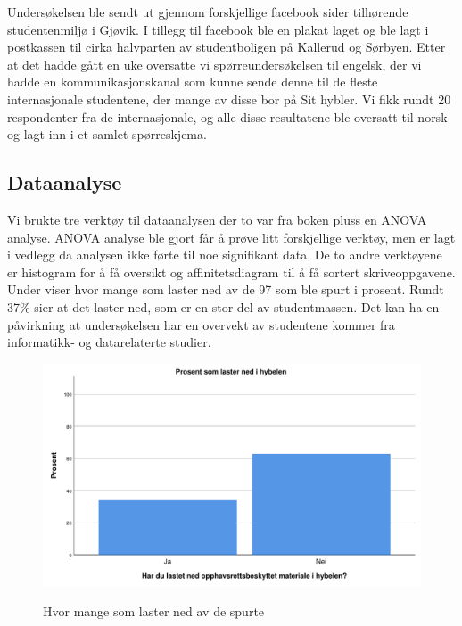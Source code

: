 Undersøkelsen ble sendt ut gjennom forskjellige facebook sider tilhørende studentenmiljø i Gjøvik. I tillegg til facebook ble en plakat laget og ble lagt i postkassen til cirka halvparten av studentboligen på Kallerud og Sørbyen. Etter at det hadde gått en uke oversatte vi spørreundersøkelsen til engelsk, der vi hadde en kommunikasjonskanal som kunne sende denne til de fleste internasjonale studentene, der mange av disse bor på Sit hybler. Vi fikk rundt 20 respondenter fra de internasjonale, og alle disse resultatene ble oversatt til norsk og lagt inn i et samlet spørreskjema. 

\subsection{Dataanalyse}
Vi brukte tre verktøy til dataanalysen der to var fra boken\cite{RCA} pluss en ANOVA analyse. ANOVA analyse ble gjort får å prøve litt forskjellige verktøy, men er lagt i vedlegg da analysen ikke førte til noe signifikant data. De to andre verktøyene er histogram for å få oversikt og affinitetsdiagram til å få sortert skriveoppgavene. Under viser hvor mange som laster ned av de 97 som ble spurt i prosent. Rundt 37\% sier at det laster ned, som er en stor del av studentmassen. Det kan ha en påvirkning at undersøkelsen har en overvekt av studentene kommer fra informatikk- og datarelaterte studier.  


\begin{figure}[H]
    \centering
    \includegraphics[scale=0.45]{case_1/bilder/lasterned.pdf}
    \label{fig:lasterned}
    \caption[Laster ned]{Hvor mange som laster ned av de spurte}
\end{figure}



